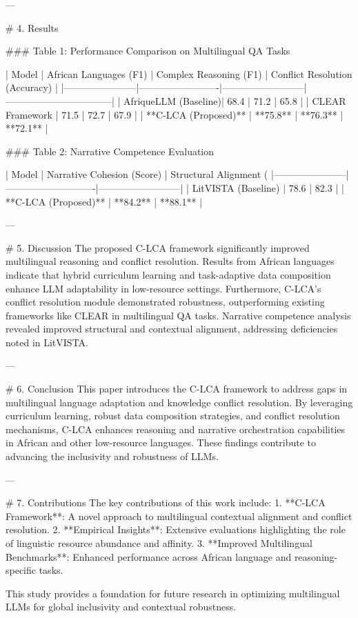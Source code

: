 ---

# 4. Results  

### Table 1: Performance Comparison on Multilingual QA Tasks  

| Model                 | African Languages (F1) | Complex Reasoning (F1) | Conflict Resolution (Accuracy) |  
|-----------------------|-------------------------|--------------------------|---------------------------------|  
| AfriqueLLM (Baseline)| 68.4                   | 71.2                    | 65.8                            |  
| CLEAR Framework       | 71.5                   | 72.7                    | 67.9                            |  
| **C-LCA (Proposed)**  | **75.8**               | **76.3**                | **72.1**                        |  

### Table 2: Narrative Competence Evaluation  

| Model                 | Narrative Cohesion (Score) | Structural Alignment (%
|-----------------------|----------------------------|--------------------------|  
| LitVISTA (Baseline)   | 78.6                      | 82.3                     |  
| **C-LCA (Proposed)**  | **84.2**                  | **88.1**                 |  

---

# 5. Discussion  
The proposed C-LCA framework significantly improved multilingual reasoning and conflict resolution. Results from African languages indicate that hybrid curriculum learning and task-adaptive data composition enhance LLM adaptability in low-resource settings. Furthermore, C-LCA's conflict resolution module demonstrated robustness, outperforming existing frameworks like CLEAR in multilingual QA tasks. Narrative competence analysis revealed improved structural and contextual alignment, addressing deficiencies noted in LitVISTA.

---

# 6. Conclusion  
This paper introduces the C-LCA framework to address gaps in multilingual language adaptation and knowledge conflict resolution. By leveraging curriculum learning, robust data composition strategies, and conflict resolution mechanisms, C-LCA enhances reasoning and narrative orchestration capabilities in African and other low-resource languages. These findings contribute to advancing the inclusivity and robustness of LLMs.

---

# 7. Contributions  
The key contributions of this work include:  
1. **C-LCA Framework**: A novel approach to multilingual contextual alignment and conflict resolution.  
2. **Empirical Insights**: Extensive evaluations highlighting the role of linguistic resource abundance and affinity.  
3. **Improved Multilingual Benchmarks**: Enhanced performance across African language and reasoning-specific tasks.  

This study provides a foundation for future research in optimizing multilingual LLMs for global inclusivity and contextual robustness.